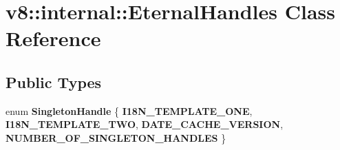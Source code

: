 \hypertarget{classv8_1_1internal_1_1_eternal_handles}{}\section{v8\+:\+:internal\+:\+:Eternal\+Handles Class Reference}
\label{classv8_1_1internal_1_1_eternal_handles}
\subsection*{Public Types}
\begin{DoxyCompactItemize}
\item 
\hypertarget{classv8_1_1internal_1_1_eternal_handles_acbe0f0927e10f28f93e1eceeb84bc66d}{}enum {\bfseries Singleton\+Handle} \{ {\bfseries I18\+N\+\_\+\+T\+E\+M\+P\+L\+A\+T\+E\+\_\+\+O\+N\+E}, 
{\bfseries I18\+N\+\_\+\+T\+E\+M\+P\+L\+A\+T\+E\+\_\+\+T\+W\+O}, 
{\bfseries D\+A\+T\+E\+\_\+\+C\+A\+C\+H\+E\+\_\+\+V\+E\+R\+S\+I\+O\+N}, 
{\bfseries N\+U\+M\+B\+E\+R\+\_\+\+O\+F\+\_\+\+S\+I\+N\+G\+L\+E\+T\+O\+N\+\_\+\+H\+A\+N\+D\+L\+E\+S}
 \}\label{classv8_1_1internal_1_1_eternal_handles_acbe0f0927e10f28f93e1eceeb84bc66d}

\end{DoxyCompactItemize}
